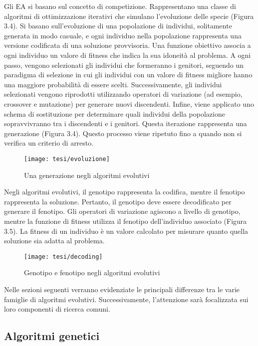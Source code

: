 Gli EA si basano sul concetto di competizione. Rappresentano una classe di algoritmi di ottimizzazione iterativi che simulano l'evoluzione delle specie (Figura 3.4). Si basano sull'evoluzione di una popolazione di individui, solitamente generata in modo casuale, e ogni individuo nella popolazione rappresenta una versione codificata di una soluzione provvisoria. Una funzione obiettivo associa a ogni individuo un valore di fitness che indica la sua idoneità al problema. A ogni passo, vengono selezionati gli individui che formeranno i genitori, seguendo un paradigma di selezione in cui gli individui con un valore di fitness migliore hanno una maggiore probabilità di essere scelti. Successivamente, gli individui selezionati vengono riprodotti utilizzando operatori di variazione (ad esempio, crossover e mutazione) per generare nuovi discendenti. Infine, viene applicato uno schema di sostituzione per determinare quali individui della popolazione sopravvivranno tra i discendenti e i genitori. Questa iterazione rappresenta una generazione (Figura 3.4). Questo processo viene ripetuto fino a quando non si verifica un criterio di arresto.

\begin{figure}[!ht] 
    \centering 
    \texttt{[image: tesi/evoluzione]} 
    \caption{Una generazione negli algoritmi evolutivi}
\end{figure}

Negli algoritmi evolutivi, il genotipo rappresenta la codifica, mentre il fenotipo rappresenta la soluzione. Pertanto, il genotipo deve essere decodificato per generare il fenotipo. Gli operatori di variazione agiscono a livello di genotipo, mentre la funzione di fitness utilizza il fenotipo dell'individuo associato (Figura 3.5). La fitness di un individuo è un valore calcolato per misurare quanto quella soluzione sia adatta al problema. 

\begin{figure}[!ht] 
    \centering 
    \texttt{[image: tesi/decoding]} 
    \caption{Genotipo e fenotipo negli algoritmi evolutivi}
\end{figure}

Nelle sezioni seguenti verranno evidenziate le principali differenze tra le varie famiglie di algoritmi evolutivi. Successivamente, l'attenzione sarà focalizzata sui loro componenti di ricerca comuni.

\subsection{Algoritmi genetici}

